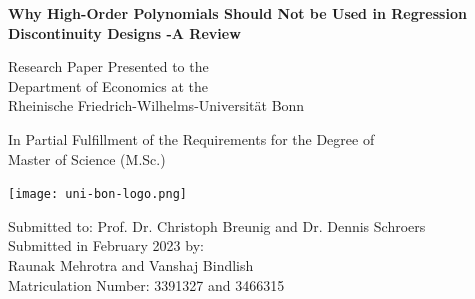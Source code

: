 \documentclass[fleqn]{article}
\begin{document}
\begin{titlepage}

\begin{center}
    \vspace*{2cm}    
    \Large
    \textbf{Why High-Order Polynomials Should Not be Used in
    Regression Discontinuity Designs -A Review}
        
    \vspace{3.5cm}
    \large
    Research Paper Presented to the \\
    \vspace{0.2cm}
    Department of Economics at the\\
    \vspace{0.2cm}
    Rheinische Friedrich-Wilhelms-Universität Bonn
        
    \vspace{1.5cm}

    In Partial Fulfillment of the Requirements for the Degree of\\ 
    \vspace{0.2cm}
    Master of Science (M.Sc.)
    
    \vspace{2cm}    
    \texttt{[image: uni-bon-logo.png]}

    \vspace{2.5cm}
    \large
    Submitted to: Prof. Dr. Christoph Breunig and Dr. Dennis Schroers\\
    \vspace{2cm}
    Submitted in February 2023 by:\\
    \vspace{0.2cm}
    Raunak Mehrotra and Vanshaj Bindlish\\
    \vspace{0.2cm}
    Matriculation Number: 3391327 and 3466315
\end{center}
\end{titlepage}

\vspace*{2cm}
\tableofcontents
\hypersetup{hypertexnames=false}
\newpage
\end{document}
